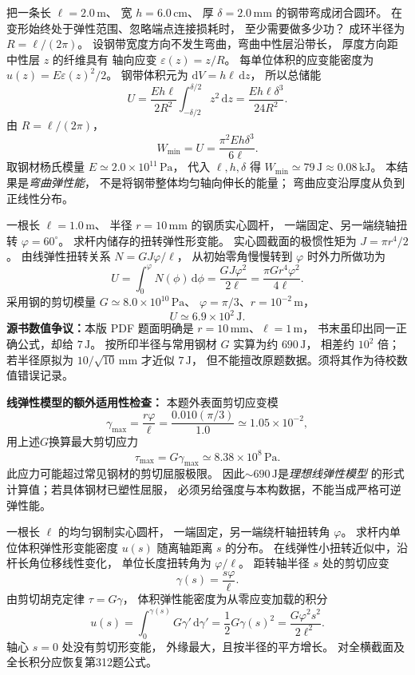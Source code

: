 把一条长 $\ell=2.0\,\mathrm m$、
宽 $h=6.0\,\mathrm{cm}$、
厚 $\delta=2.0\,\mathrm{mm}$ 的钢带弯成闭合圆环。
在变形始终处于弹性范围、忽略端点连接损耗时，
至少需要做多少功？
\exsolution
成环半径为 $R=\ell/(2\pi)$。
设钢带宽度方向不发生弯曲，弯曲中性层沿带长，
厚度方向距中性层 $z$ 的纤维具有
轴向应变 $\varepsilon(z)=z/R$。
每单位体积的应变能密度为
$u(z)=E\varepsilon(z)^2/2$。
钢带体积元为
$\mathrm dV=h\ell\,\mathrm dz$，
所以总储能
\[
U=\frac{Eh\ell}{2R^2}
\int_{-\delta/2}^{\delta/2}z^2\,\mathrm dz
=\frac{Eh\ell\delta^3}{24R^2}.
\]
由 $R=\ell/(2\pi)$，
\[
\boxed{W_{\min}=U=
\frac{\pi^2Eh\delta^3}{6\ell}}.
\]
取钢材杨氏模量 $E\simeq2.0\times10^{11}\,\mathrm{Pa}$，
代入 $\ell,h,\delta$ 得
$\boxed{W_{\min}\simeq79\,\mathrm J\approx0.08\,\mathrm{kJ}}$。
\excheck 本结果是\emph{弯曲弹性能}，
不是将钢带整体均匀轴向伸长的能量；
弯曲应变沿厚度从负到正线性分布。

一根长 $\ell=1.0\,\mathrm m$、
半径 $r=10\,\mathrm{mm}$ 的钢质实心圆杆，
一端固定、另一端绕轴扭转
$\varphi=60^\circ$。
求杆内储存的扭转弹性形变能。
\exsolution
实心圆截面的极惯性矩为 $J=\pi r^4/2$。
由线弹性扭转关系 $N=GJ\varphi/\ell$，
从初始零角慢慢转到 $\varphi$ 时外力所做功为
\[
U=\int_0^\varphi N(\phi)\,\mathrm d\phi
=\frac{GJ\varphi^2}{2\ell}
=\boxed{\frac{\pi G r^4\varphi^2}{4\ell}}.
\]
采用钢的剪切模量
$G\simeq8.0\times10^{10}\,\mathrm{Pa}$、
$\varphi=\pi/3$、$r=10^{-2}\,\mathrm m$，
\[
\boxed{U\simeq6.9\times10^2\,\mathrm J}.
\]
\excheck \textbf{源书数值争议：}本版 PDF 题面明确是
$r=10\,\mathrm{mm}$、$\ell=1\,\mathrm m$，
书末虽印出同一正确公式，却给 $7\,\mathrm J$。
按所印半径与常用钢材 $G$ 实算为约 $690\,\mathrm J$，
相差约 $10^2$ 倍；若半径原拟为
$10/\sqrt{10}\,\mathrm{mm}$ 才近似 $7\,\mathrm J$，
但不能擅改原题数据。须将其作为待校数值错误记录。

\textbf{线弹性模型的额外适用性检查：}
本题外表面剪切应变模
\[
\gamma_{\max}=\frac{r\varphi}{\ell}
=\frac{0.010(\pi/3)}{1.0}
\simeq1.05\times10^{-2},
\]
用上述$G$换算最大剪切应力
\[
\boxed{\tau_{\max}=G\gamma_{\max}
\simeq8.38\times10^8\,\mathrm{Pa}}.
\]
此应力可能超过常见钢材的剪切屈服极限。
因此$\sim690\,\mathrm J$是\emph{理想线弹性模型}
的形式计算值；若具体钢材已塑性屈服，
必须另给强度与本构数据，不能当成严格可逆弹性能。

一根长 $\ell$ 的均匀钢制实心圆杆，
一端固定，另一端绕杆轴扭转角 $\varphi$。
求杆内单位体积弹性形变能密度 $u(s)$
随离轴距离 $s$ 的分布。
\exsolution
在线弹性小扭转近似中，沿杆长角位移线性变化，
单位长度扭转角为 $\varphi/\ell$。
距转轴半径 $s$ 处的剪切应变
\[
\gamma(s)=\frac{s\varphi}{\ell}.
\]
由剪切胡克定律 $\tau=G\gamma$，
体积弹性能密度为从零应变加载的积分
\[
u(s)=\int_0^{\gamma(s)}G\gamma'\,\mathrm d\gamma'
=\frac12G\gamma(s)^2
=\boxed{\frac{G\varphi^2s^2}{2\ell^2}}.
\]
\excheck 轴心 $s=0$ 处没有剪切形变能，
外缘最大，且按半径的平方增长。
对全横截面及全长积分应恢复第312题公式。

